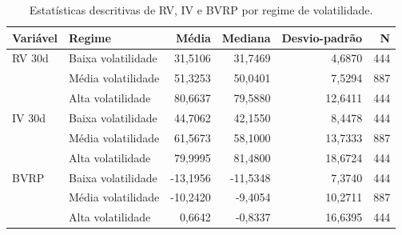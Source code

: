 \begin{table}[H]
\centering
\small
\caption{Estatísticas descritivas de RV, IV e BVRP por regime de volatilidade.}
\label{tab:cap9_estatisticas_regimes}
\begin{tabular}{llrrrr}
\toprule
Variável & Regime & Média & Mediana & Desvio-padrão & N \\
\midrule
RV 30d & Baixa volatilidade & 31,5106 & 31,7469 & 4,6870 & 444 \\
 & Média volatilidade & 51,3253 & 50,0401 & 7,5294 & 887 \\
 & Alta volatilidade & 80,6637 & 79,5880 & 12,6411 & 444 \\
\midrule
IV 30d & Baixa volatilidade & 44,7062 & 42,1550 & 8,4478 & 444 \\
 & Média volatilidade & 61,5673 & 58,1000 & 13,7333 & 887 \\
 & Alta volatilidade & 79,9995 & 81,4800 & 18,6724 & 444 \\
\midrule
BVRP & Baixa volatilidade & -13,1956 & -11,5348 & 7,3740 & 444 \\
 & Média volatilidade & -10,2420 & -9,4054 & 10,2711 & 887 \\
 & Alta volatilidade & 0,6642 & -0,8337 & 16,6395 & 444 \\
\bottomrule
\end{tabular}
\end{table}